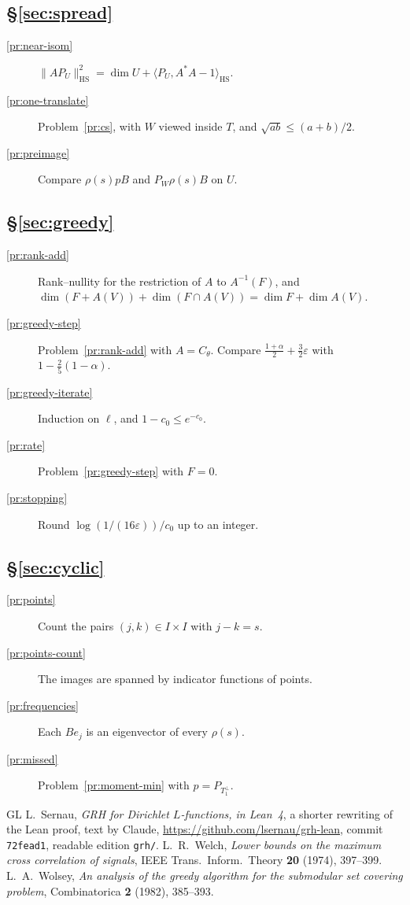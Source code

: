 \documentclass[reqno]{amsart}
\numberwithin{equation}{section}
\theoremstyle{definition}
\theoremstyle{plain}
\theoremstyle{remark}
\newcommand{\HS}{\mathrm{HS}}
\begin{document}
\subsection*{\S\ref{sec:spread}}
\begin{description}
\item[\ref{pr:near-isom}] \(\lVert AP_U \rVert_\HS^2 = \dim U + \langle P_U, A^*A - 1 \rangle_\HS\).
\item[\ref{pr:one-translate}] Problem~\ref{pr:cs}, with \(W\) viewed inside \(T\), and \(\sqrt{ab} \le (a + b)/2\).
\item[\ref{pr:preimage}] Compare \(\rho(s)pB\) and \(P_W\rho(s)B\) on \(U\).
\end{description}

\subsection*{\S\ref{sec:greedy}}
\begin{description}
\item[\ref{pr:rank-add}] Rank--nullity for the restriction of \(A\) to \(A^{-1}(F)\), and \(\dim(F + A(V)) + \dim(F \cap A(V)) = \dim F + \dim A(V)\).
\item[\ref{pr:greedy-step}] Problem~\ref{pr:rank-add} with \(A = C_\theta\).  Compare \(\frac{1+\alpha}{2} + \frac32\varepsilon\) with \(1 - \frac25(1 - \alpha)\).
\item[\ref{pr:greedy-iterate}] Induction on \(\ell\), and \(1 - c_0 \le e^{-c_0}\).
\item[\ref{pr:rate}] Problem~\ref{pr:greedy-step} with \(F = 0\).
\item[\ref{pr:stopping}] Round \(\log(1/(16\varepsilon))/c_0\) up to an integer.
\end{description}

\subsection*{\S\ref{sec:cyclic}}
\begin{description}
\item[\ref{pr:points}] Count the pairs \((j, k) \in I \times I\) with \(j - k = s\).
\item[\ref{pr:points-count}] The images are spanned by indicator functions of points.
\item[\ref{pr:frequencies}] Each \(Be_j\) is an eigenvector of every \(\rho(s)\).
\item[\ref{pr:missed}] Problem~\ref{pr:moment-min} with \(p = P_{T_1^\perp}\).
\end{description}

\begin{thebibliography}{GL}
 L.~Sernau, \emph{GRH for Dirichlet \(L\)-functions, in Lean~4}, a shorter rewriting of the Lean proof, text by Claude, \url{https://github.com/lsernau/grh-lean}, commit \texttt{72fead1}, readable edition \texttt{grh/}.
 L.~R.~Welch, \emph{Lower bounds on the maximum cross correlation of signals}, IEEE Trans.\ Inform.\ Theory \textbf{20} (1974), 397--399.
 L.~A.~Wolsey, \emph{An analysis of the greedy algorithm for the submodular set covering problem}, Combinatorica \textbf{2} (1982), 385--393.
\end{thebibliography}
\end{document}
